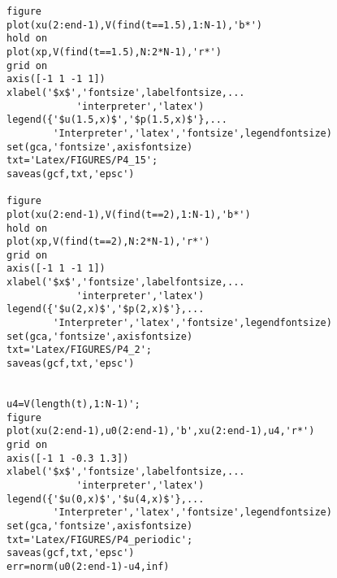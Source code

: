 \begin{verbatim}
figure
plot(xu(2:end-1),V(find(t==1.5),1:N-1),'b*')
hold on
plot(xp,V(find(t==1.5),N:2*N-1),'r*')
grid on
axis([-1 1 -1 1])
xlabel('$x$','fontsize',labelfontsize,...
            'interpreter','latex')
legend({'$u(1.5,x)$','$p(1.5,x)$'},...
        'Interpreter','latex','fontsize',legendfontsize)
set(gca,'fontsize',axisfontsize)
txt='Latex/FIGURES/P4_15';
saveas(gcf,txt,'epsc')

figure
plot(xu(2:end-1),V(find(t==2),1:N-1),'b*')
hold on
plot(xp,V(find(t==2),N:2*N-1),'r*')
grid on
axis([-1 1 -1 1])
xlabel('$x$','fontsize',labelfontsize,...
            'interpreter','latex')
legend({'$u(2,x)$','$p(2,x)$'},...
        'Interpreter','latex','fontsize',legendfontsize)
set(gca,'fontsize',axisfontsize)
txt='Latex/FIGURES/P4_2';
saveas(gcf,txt,'epsc')


u4=V(length(t),1:N-1)';
figure
plot(xu(2:end-1),u0(2:end-1),'b',xu(2:end-1),u4,'r*')
grid on
axis([-1 1 -0.3 1.3])
xlabel('$x$','fontsize',labelfontsize,...
            'interpreter','latex')
legend({'$u(0,x)$','$u(4,x)$'},...
        'Interpreter','latex','fontsize',legendfontsize)
set(gca,'fontsize',axisfontsize)
txt='Latex/FIGURES/P4_periodic';
saveas(gcf,txt,'epsc')
err=norm(u0(2:end-1)-u4,inf)
\end{verbatim}